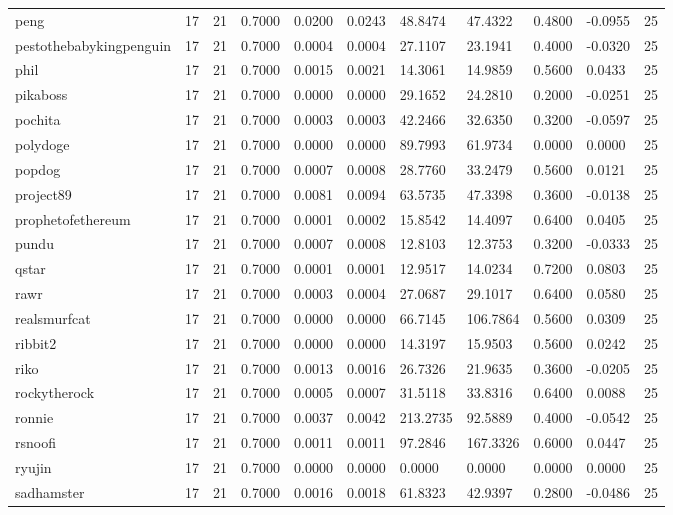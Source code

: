 \begin{table}[htbp]
\begin{tabular}{lllllllllll}
peng & 17 & 21 & 0.7000 & 0.0200 & 0.0243 & 48.8474 & 47.4322 & 0.4800 & -0.0955 & 25 \\
pestothebabykingpenguin & 17 & 21 & 0.7000 & 0.0004 & 0.0004 & 27.1107 & 23.1941 & 0.4000 & -0.0320 & 25 \\
phil & 17 & 21 & 0.7000 & 0.0015 & 0.0021 & 14.3061 & 14.9859 & 0.5600 & 0.0433 & 25 \\
pikaboss & 17 & 21 & 0.7000 & 0.0000 & 0.0000 & 29.1652 & 24.2810 & 0.2000 & -0.0251 & 25 \\
pochita & 17 & 21 & 0.7000 & 0.0003 & 0.0003 & 42.2466 & 32.6350 & 0.3200 & -0.0597 & 25 \\
polydoge & 17 & 21 & 0.7000 & 0.0000 & 0.0000 & 89.7993 & 61.9734 & 0.0000 & 0.0000 & 25 \\
popdog & 17 & 21 & 0.7000 & 0.0007 & 0.0008 & 28.7760 & 33.2479 & 0.5600 & 0.0121 & 25 \\
project89 & 17 & 21 & 0.7000 & 0.0081 & 0.0094 & 63.5735 & 47.3398 & 0.3600 & -0.0138 & 25 \\
prophetofethereum & 17 & 21 & 0.7000 & 0.0001 & 0.0002 & 15.8542 & 14.4097 & 0.6400 & 0.0405 & 25 \\
pundu & 17 & 21 & 0.7000 & 0.0007 & 0.0008 & 12.8103 & 12.3753 & 0.3200 & -0.0333 & 25 \\
qstar & 17 & 21 & 0.7000 & 0.0001 & 0.0001 & 12.9517 & 14.0234 & 0.7200 & 0.0803 & 25 \\
rawr & 17 & 21 & 0.7000 & 0.0003 & 0.0004 & 27.0687 & 29.1017 & 0.6400 & 0.0580 & 25 \\
realsmurfcat & 17 & 21 & 0.7000 & 0.0000 & 0.0000 & 66.7145 & 106.7864 & 0.5600 & 0.0309 & 25 \\
ribbit2 & 17 & 21 & 0.7000 & 0.0000 & 0.0000 & 14.3197 & 15.9503 & 0.5600 & 0.0242 & 25 \\
riko & 17 & 21 & 0.7000 & 0.0013 & 0.0016 & 26.7326 & 21.9635 & 0.3600 & -0.0205 & 25 \\
rockytherock & 17 & 21 & 0.7000 & 0.0005 & 0.0007 & 31.5118 & 33.8316 & 0.6400 & 0.0088 & 25 \\
ronnie & 17 & 21 & 0.7000 & 0.0037 & 0.0042 & 213.2735 & 92.5889 & 0.4000 & -0.0542 & 25 \\
rsnoofi & 17 & 21 & 0.7000 & 0.0011 & 0.0011 & 97.2846 & 167.3326 & 0.6000 & 0.0447 & 25 \\
ryujin & 17 & 21 & 0.7000 & 0.0000 & 0.0000 & 0.0000 & 0.0000 & 0.0000 & 0.0000 & 25 \\
sadhamster & 17 & 21 & 0.7000 & 0.0016 & 0.0018 & 61.8323 & 42.9397 & 0.2800 & -0.0486 & 25 \\

\end{tabular}
\end{table}
